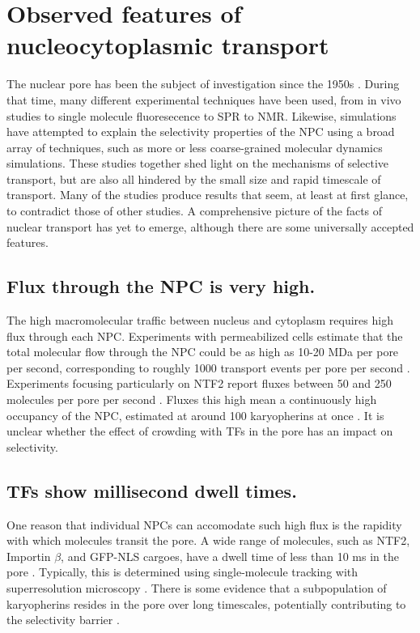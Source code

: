 \section{Observed features of nucleocytoplasmic transport} 
The nuclear pore has been the subject of investigation since the 1950s \cite{hapensomething16 or another review article with timeline}.  During that time, many different experimental techniques have been used, from in vivo studies to single molecule fluoresecence to SPR to NMR.  Likewise, simulations have attempted to explain the selectivity properties of the NPC using a broad array of techniques, such as more or less coarse-grained molecular dynamics simulations.  These studies together shed light on the mechanisms of selective transport, but are also all hindered by the small size and rapid timescale of transport.  Many of the studies produce results that seem, at least at first glance, to contradict those of other studies.  A comprehensive picture of the facts of nuclear transport has yet to emerge, although there are some universally accepted features.

\subsection{Flux through the NPC is very high.}
The high macromolecular traffic between nucleus and cytoplasm requires high flux through each NPC.  Experiments with permeabilized cells estimate that the total molecular flow through the NPC could be as high as 10-20 MDa per pore per second, corresponding to roughly 1000 transport events per pore per second \cite{ribbeck01}.  Experiments focusing particularly on NTF2 report fluxes between 50 and 250 molecules per pore per second \cite{ribbeck01, siebrasse02, kiskin03}.  Fluxes this high mean a continuously high occupancy of the NPC, estimated at around 100 karyopherins at once \cite{paradise07}.  It is unclear whether the effect of crowding with TFs in the pore has an impact on selectivity.

\subsection{TFs show millisecond dwell times.}
One reason that individual NPCs can accomodate such high flux is the rapidity with which molecules transit the pore.  A wide range of molecules, such as NTF2, Importin $\beta$, and GFP-NLS cargoes, have a dwell time of less than 10 ms in the pore \cite{tu11, yang06, dange08, kubitscheck05}.  Typically, this is determined using single-molecule tracking with superresolution microscopy \cite{tu11}.  There is some evidence that a subpopulation of karyopherins resides in the pore over long timescales, potentially contributing to the selectivity barrier \cite{kapinos17}.

